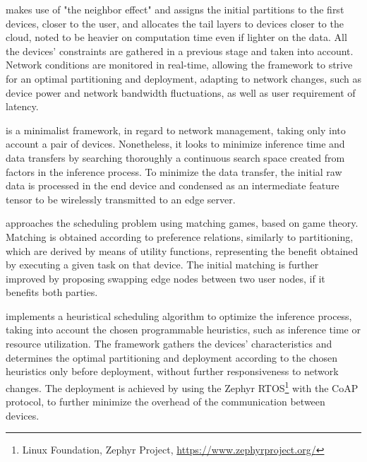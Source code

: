 \begin{description}[style=unboxed, leftmargin=1cm, font=\bfseries]

    \item[CAS \cite{wang_context-aware_2021}]
    makes use of "the neighbor effect" and assigns the initial partitions 
    to the first devices, closer to the user, and allocates the tail layers to
    devices closer to the cloud, noted to be heavier on computation time
    even if lighter on the data. All the devices' constraints
    are gathered in a previous stage and taken into account. Network conditions
    are monitored in real-time, allowing the framework to strive for an optimal
    partitioning and deployment, adapting to network changes, such as device power 
    and network bandwidth fluctuations, as well as user requirement of latency. 

    \item [CoFANN \cite{tran-van_cofann_2025}]
    is a minimalist framework, in regard to network management, taking only
    into account a pair of devices. Nonetheless, it looks to minimize inference
    time and data transfers by searching thoroughly a continuous search space
    created from
    factors in the inference process. To minimize the data transfer, the initial
    raw data is processed in the end device and condensed as an intermediate 
    feature tensor to be wirelessly transmitted to an edge server.

    \item[DINA \cite{t_mohammed_distributed_2020}]
    approaches the scheduling problem using matching games, based on game theory.
    Matching is obtained according to preference relations, similarly to 
    partitioning, which are derived by means of utility functions, representing 
    the benefit obtained by executing a given task on that device. The initial 
    matching is further improved by proposing swapping edge nodes between two 
    user nodes, if it benefits both parties.

    \item[NAMP \cite{rego::namp}]
    implements a heuristical scheduling algorithm to optimize the inference 
    process, taking into account the chosen programmable heuristics, such as 
    inference time or resource utilization. The framework gathers the devices' 
    characteristics and determines the optimal partitioning and deployment
    according to the chosen heuristics only before deployment, without further
    responsiveness to network changes. The deployment is achieved by using
    the Zephyr RTOS\footnote{Linux Foundation, Zephyr Project, \url{https://www.zephyrproject.org/}}
    with the CoAP protocol, to further minimize the overhead 
    of the communication between devices.



\end{description}
